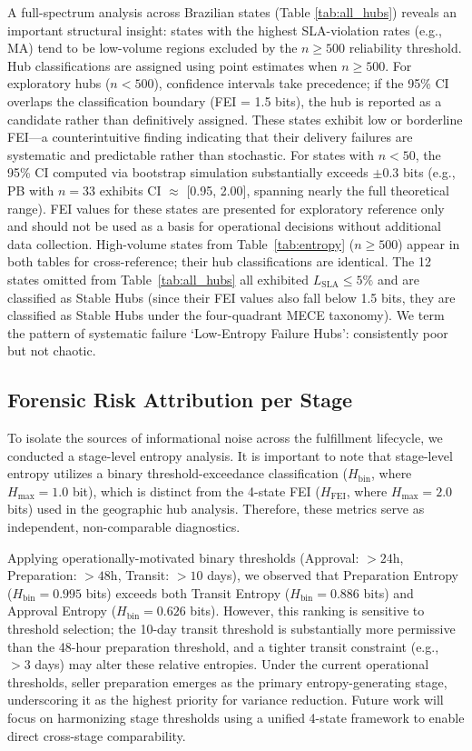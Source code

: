 \documentclass[conference]{IEEEtran}
\begin{document}
A full-spectrum analysis across Brazilian states (Table \ref{tab:all_hubs}) reveals an important structural insight: states with the highest SLA-violation rates (e.g., MA) tend to be low-volume regions excluded by the $n \ge 500$ reliability threshold. Hub classifications are assigned using point estimates when $n \ge 500$. For exploratory hubs ($n < 500$), confidence intervals take precedence; if the 95\% CI overlaps the classification boundary (FEI = 1.5 bits), the hub is reported as a candidate rather than definitively assigned. These states exhibit low or borderline FEI---a counterintuitive finding indicating that their delivery failures are systematic and predictable rather than stochastic. For states with $n < 50$, the 95\% CI computed via bootstrap simulation substantially exceeds $\pm 0.3$ bits (e.g., PB with $n=33$ exhibits CI $\approx$ [0.95, 2.00], spanning nearly the full theoretical range). FEI values for these states are presented for exploratory reference only and should not be used as a basis for operational decisions without additional data collection. High-volume states from Table~\ref{tab:entropy} ($n \ge 500$) appear in both tables for cross-reference; their hub classifications are identical. The 12 states omitted from Table~\ref{tab:all_hubs} all exhibited $L_{\text{SLA}} \leq 5\%$ and are classified as Stable Hubs (since their FEI values also fall below 1.5 bits, they are classified as Stable Hubs under the four-quadrant MECE taxonomy). We term the pattern of systematic failure `Low-Entropy Failure Hubs': consistently poor but not chaotic.

\subsection{Forensic Risk Attribution per Stage}
To isolate the sources of informational noise across the fulfillment lifecycle, we conducted a stage-level entropy analysis. It is important to note that stage-level entropy utilizes a binary threshold-exceedance classification ($H_{\text{bin}}$, where $H_{\max} = 1.0$ bit), which is distinct from the 4-state FEI ($H_{\text{FEI}}$, where $H_{\max} = 2.0$ bits) used in the geographic hub analysis. Therefore, these metrics serve as independent, non-comparable diagnostics. 

Applying operationally-motivated binary thresholds (Approval: $>24$h, Preparation: $>48$h, Transit: $>10$ days), we observed that Preparation Entropy ($H_{\text{bin}}=0.995$ bits) exceeds both Transit Entropy ($H_{\text{bin}}=0.886$ bits) and Approval Entropy ($H_{\text{bin}}=0.626$ bits). However, this ranking is sensitive to threshold selection; the 10-day transit threshold is substantially more permissive than the 48-hour preparation threshold, and a tighter transit constraint (e.g., $>3$ days) may alter these relative entropies. Under the current operational thresholds, seller preparation emerges as the primary entropy-generating stage, underscoring it as the highest priority for variance reduction. Future work will focus on harmonizing stage thresholds using a unified 4-state framework to enable direct cross-stage comparability.
\end{document}
